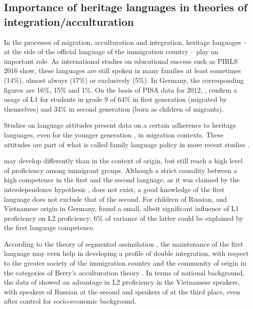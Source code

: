 \documentclass[output=paper,colorlinks,citecolor=brown]{langscibook}
\begin{document}
\subsection{Importance of heritage languages in theories of integration/acculturation}\label{ch2.5.ss.2.2}

In the processes of migration, acculturation and integration, heritage languages -- at the side of the official language of the immigration country -- play an important role. As international studies on educational success such as PIRLS 2016 \citep{mullis_et_al2017} show, these languages are still spoken in many families at least sometimes (14\%), almost always (17\%) or exclusively (5\%). In Germany, the corresponding figures are 16\%, 15\% and 1\%. On the basis of PISA data for 2012, \citet{gebhardt_rauch_mang_saelzer_stanat2013}, confirm a usage of L1 for students in grade 9 of 64\% in first generation (migrated by themselves) and 34\% in second generation (born as children of migrants). 

Studies on language attitudes \citep{baker1992} present data on a certain adherence to heritage languages, even for the younger generation \citep{boos-nuenning_karakasoglu2015,broeder_extra1999}, in migration contexts. These attitudes are part of what is called family language policy in more recent studies \citep{king_fogle_logan-terry2008}.

 may develop differently than in the context of origin, but still reach a high level of proficiency among immigrant groups. Although a strict causality between a high competence in the first and the second language, as it was claimed by the interdependence hypothesis \citep{cummins1979}, does not exist, a good knowledge of the first language does not exclude that of the second. For children of Russian,  and Vietnamese origin in Germany, \citet{knigge_klinger_schnoor_gogolin2015} found a small, albeit significant influence of L1 proficiency on L2 proficiency: 6\% of variance of the latter could be explained by the first language competence. 

According to the theory of segmented assimilation \citep{portes_fernandez-kelly_haller2009,kristen_olczyk2013}, the maintenance of the first language may even help in developing a profile of double integration, with respect to the greater society of the immigration country and the community of origin in the categories of Berry's acculturation theory \citep{berry1997,berry_phinney_sam_vedder2006}. In terms of national background, the data of \citet{knigge_klinger_schnoor_gogolin2015} showed an advantage in L2 proficiency in the Vietnamese speakers, with speakers of Russian at the second and speakers of  at the third place, even after control for socio-economic background.
\end{document}
